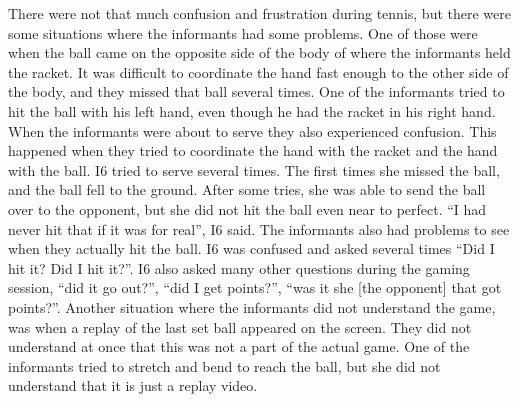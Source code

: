 There were not that much confusion and frustration during tennis, but there were some situations where the informants had some problems. One of those were when the ball came on the opposite side of the body of where the informants held the racket. It was difficult to coordinate the hand fast enough to the other side of the body, and they missed that ball several times. One of the informants tried to hit the ball with his left hand, even though he had the racket in his right hand. When the informants were about to serve they also experienced confusion. This happened when they tried to coordinate the hand with the racket and the hand with the ball. I6 tried to serve several times. The first times she missed the ball, and the ball fell to the ground. After some tries, she was able to send the ball over to the opponent, but she did not hit the ball even near to perfect. “I had never hit that if it was for real”, I6 said. The informants also had problems to see when they actually hit the ball. I6 was confused and asked several times “Did I hit it? Did I hit it?”. I6 also asked many other questions during the gaming session, “did it go out?”, “did I get points?”, “was it she [the opponent] that got points?”. Another situation where the informants did not understand the game, was when a replay of the last set ball appeared on the screen. They did not understand at once that this was not a part of the actual game. One of the informants tried to stretch and bend to reach the ball, but she did not understand that it is just a replay video.

